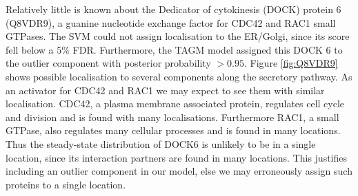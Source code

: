 \documentclass[12pt,english]{article}\usepackage[]{graphicx}\usepackage[]{color}
\begin{document}
Relatively little is known about the Dedicator of cytokinesis (DOCK) protein 6 (Q8VDR9),
a guanine nucleotide exchange factor for CDC42 and RAC1 small GTPases. The SVM could not
assign localisation to the ER/Golgi, since its score fell below a $5\%$ FDR. Furthermore,
the TAGM model assigned this DOCK 6 to the outlier component with posterior probability $>0.95$.
Figure \ref{fig:Q8VDR9} shows possible localisation to several components along the
secretory pathway. As an activator for CDC42 and RAC1 we may expect to see them
with similar localisation. CDC42, a plasma membrane associated protein, regulates
cell cycle and division and is found with many localisations. Furthermore RAC1, a small
GTPase, also regulates many cellular processes and is found in many locations. Thus
the steady-state distribution of DOCK6 is unlikely to be in a single location, since
its interaction partners are found in many locations. This justifies including
an outlier component in our model, else we may erroneously assign such proteins
to a single location.
\end{document}
